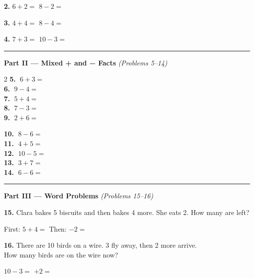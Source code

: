 \documentclass[12pt, letterpaper]{article}
\newcommand{\numbox}{\fbox{\hspace{0.6cm}\vphantom{0}}}
\begin{document}
\bigskip
\noindent\textbf{2.} \quad $6 + 2 = $ \numbox \hspace{2cm} $8 - 2 = $ \numbox

\bigskip
\noindent\textbf{3.} \quad $4 + 4 = $ \numbox \hspace{2cm} $8 - 4 = $ \numbox

\bigskip
\noindent\textbf{4.} \quad $7 + 3 = $ \numbox \hspace{2cm} $10 - 3 = $ \numbox

\bigskip
\noindent\textcolor{scholared}{\rule{\linewidth}{0.4pt}}

\noindent\textcolor{scholared}{\large\textbf{Part II — Mixed + and − Facts}} \hfill \textit{(Problems 5–14)}

\bigskip
\begin{multicols}{2}
\noindent\textbf{5.} $\; 6 + 3 = $ \numbox \\[10pt]
\noindent\textbf{6.} $\; 9 - 4 = $ \numbox \\[10pt]
\noindent\textbf{7.} $\; 5 + 4 = $ \numbox \\[10pt]
\noindent\textbf{8.} $\; 7 - 3 = $ \numbox \\[10pt]
\noindent\textbf{9.} $\; 2 + 6 = $ \numbox

\columnbreak

\noindent\textbf{10.} $\; 8 - 6 = $ \numbox \\[10pt]
\noindent\textbf{11.} $\; 4 + 5 = $ \numbox \\[10pt]
\noindent\textbf{12.} $\; 10 - 5 = $ \numbox \\[10pt]
\noindent\textbf{13.} $\; 3 + 7 = $ \numbox \\[10pt]
\noindent\textbf{14.} $\; 6 - 6 = $ \numbox
\end{multicols}

\bigskip
\noindent\textcolor{scholared}{\rule{\linewidth}{0.4pt}}

\noindent\textcolor{scholared}{\large\textbf{Part III — Word Problems}} \hfill \textit{(Problems 15–16)}

\bigskip
\noindent\textbf{15.} Clara bakes 5 biscuits and then bakes 4 more. She eats 2. How many are left?

\medskip
\hspace{2em} First: $5 + 4 = $ \numbox \hspace{1cm} Then: \numbox $ - 2 = $ \numbox

\bigskip
\noindent\textbf{16.} There are 10 birds on a wire. 3 fly away, then 2 more arrive.\\
How many birds are on the wire now?

\medskip
\hspace{2em} $10 - 3 = $ \numbox \hspace{1cm} \numbox $+ 2 = $ \numbox
\end{document}
